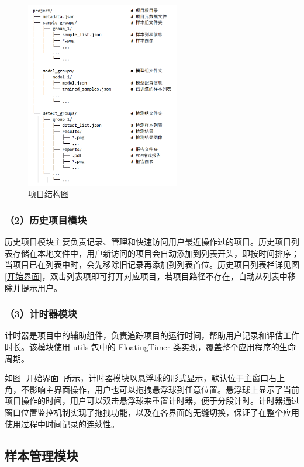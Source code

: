 \documentclass[
  ]{njuthesis}
\begin{document}
\begin{figure}[H]
    \centering
    \includegraphics[width=0.6\textwidth]{images/项目结构图.png}
    \caption{项目结构图}
    \label{项目结构图}
\end{figure}

\subsubsection{（2）历史项目模块}

历史项目模块主要负责记录、管理和快速访问用户最近操作过的项目。历史项目列表存储在本地文件中，用户新访问的项目会自动添加到列表开头，即按时间排序；当项目已在列表中时，会先移除旧记录再添加到列表首位。历史项目列表栏详见图 \ref{开始界面}，双击列表项即可打开对应项目，若项目路径不存在，自动从列表中移除并提示用户。

\subsubsection{（3）计时器模块}

计时器是项目中的辅助组件，负责追踪项目的运行时间，帮助用户记录和评估工作时长。该模块使用 utils 包中的 FloatingTimer 类实现，覆盖整个应用程序的生命周期。

如图 \ref{开始界面} 所示，计时器模块以悬浮球的形式显示，默认位于主窗口右上角，不影响主界面操作，用户也可以拖拽悬浮球到任意位置。悬浮球上显示了当前项目操作的时间，用户可以双击悬浮球来重置计时器，便于分段计时。计时器通过窗口位置监控机制实现了拖拽功能，以及在各界面的无缝切换，保证了在整个应用使用过程中时间记录的连续性。

\subsection{样本管理模块}
\end{document}
